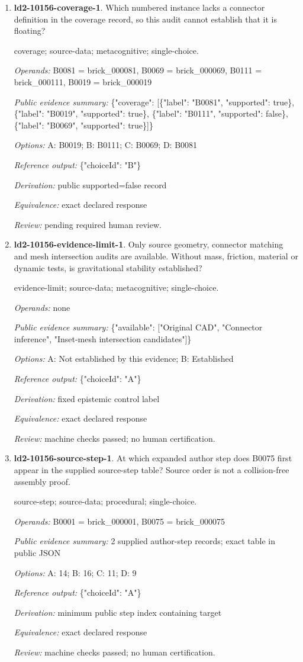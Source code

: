 \begin{enumerate}
\item \textbf{ld2-10156-coverage-1}. Which numbered instance lacks a connector definition in the coverage record, so this audit cannot establish that it is floating?
\par{\small coverage; source-data; metacognitive; single-choice.\par\textit{Operands:} B0081 = brick\_000081, B0069 = brick\_000069, B0111 = brick\_000111, B0019 = brick\_000019\par\textit{Public evidence summary:} \{"coverage": [\{"label": "B0081", "supported": true\}, \{"label": "B0019", "supported": true\}, \{"label": "B0111", "supported": false\}, \{"label": "B0069", "supported": true\}]\}\par\textit{Options:} A: B0019; B: B0111; C: B0069; D: B0081\par\textit{Reference output:} \{"choiceId": "B"\}\par\textit{Derivation:} public supported=false record\par\textit{Equivalence:} exact declared response\par\textit{Review:} pending required human review.}
\item \textbf{ld2-10156-evidence-limit-1}. Only source geometry, connector matching and mesh intersection audits are available. Without mass, friction, material or dynamic tests, is gravitational stability established?
\par{\small evidence-limit; source-data; metacognitive; single-choice.\par\textit{Operands:} none\par\textit{Public evidence summary:} \{"available": ["Original CAD", "Connector inference", "Inset-mesh intersection candidates"]\}\par\textit{Options:} A: Not established by this evidence; B: Established\par\textit{Reference output:} \{"choiceId": "A"\}\par\textit{Derivation:} fixed epistemic control label\par\textit{Equivalence:} exact declared response\par\textit{Review:} machine checks passed; no human certification.}
\item \textbf{ld2-10156-source-step-1}. At which expanded author step does B0075 first appear in the supplied source-step table? Source order is not a collision-free assembly proof.
\par{\small source-step; source-data; procedural; single-choice.\par\textit{Operands:} B0001 = brick\_000001, B0075 = brick\_000075\par\textit{Public evidence summary:} 2 supplied author-step records; exact table in public JSON\par\textit{Options:} A: 14; B: 16; C: 11; D: 9\par\textit{Reference output:} \{"choiceId": "A"\}\par\textit{Derivation:} minimum public step index containing target\par\textit{Equivalence:} exact declared response\par\textit{Review:} machine checks passed; no human certification.}

\end{enumerate}
